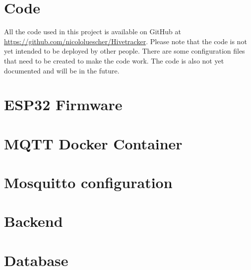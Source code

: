 \chapter{Code}
All the code used in this project is available on GitHub at \url{https://github.com/nicololuescher/Hivetracker}. Please note that the code is not yet intended to be deployed by other people. There are some configuration files that need to be created to make the code work. The code is also not yet documented and will be in the future.

\chapter{ESP32 Firmware}


\chapter{MQTT Docker Container}


\chapter{Mosquitto configuration}


\chapter{Backend}\label{sec:backend}




\chapter{Database}



